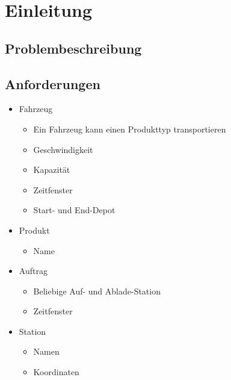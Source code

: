 \section{Einleitung}

\subsection{Problembeschreibung}

\subsection{Anforderungen}
\begin{itemize}
 \item Fahrzeug
 \begin{itemize}
  \item Ein Fahrzeug kann einen Produkttyp transportieren
  \item Geschwindigkeit
  \item Kapazität
  \item Zeitfenster
  \item Start- und End-Depot
 \end{itemize}
 \item Produkt
 \begin{itemize}
  \item Name
 \end{itemize}
 \item Auftrag
 \begin{itemize}
  \item Beliebige Auf- und Ablade-Station
  \item Zeitfenster 
 \end{itemize}
 \item Station
 \begin{itemize}
  \item Namen
  \item Koordinaten
 \end{itemize}

\end{itemize}

